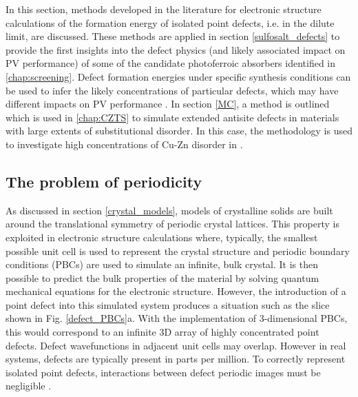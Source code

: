\documentclass[11pt, twoside]{report}
\begin{document}
In this section, methods developed in the literature for electronic structure calculations of the formation energy of isolated point defects, i.e. in the dilute limit, are discussed. 
These methods are applied in section \ref{sulfosalt_defects} to provide the first insights into the defect physics (and likely associated impact on PV performance) of some of the candidate photoferroic absorbers identified in \autoref{chap:screening}.
Defect formation energies under specific synthesis conditions can be used to infer the likely concentrations of particular defects, which may have different impacts on PV performance \cite{Aron_defect_tolerance}. 
In section \ref{MC}, a method is outlined which is used in \autoref{chap:CZTS} to simulate extended antisite defects in materials with large extents of substitutional disorder. In this case, the methodology is used to investigate high concentrations of Cu-Zn disorder in {\CZTS}. 

\subsection{The problem of periodicity}
As discussed in section \ref{crystal_models}, models of crystalline solids are built around the translational symmetry of periodic crystal lattices. This property is exploited in electronic structure calculations where, typically, the smallest possible unit cell is used to represent the crystal structure and periodic boundary conditions (PBCs) are used to simulate an infinite, bulk crystal. It is then possible to predict the bulk properties of the material by solving quantum mechanical equations for the electronic structure. However, the introduction of a point defect into this simulated system produces a situation such as the slice shown in Fig. \ref{defect_PBCs}a. With the implementation of 3-dimensional PBCs, this would correspond to an infinite 3D array of highly concentrated point defects. Defect wavefunctions in adjacent unit cells may overlap. However in real systems, defects are typically present in parts per million.  To correctly represent isolated point defects, interactions between defect periodic images must be negligible \cite{freysoldt_rev}.
\end{document}
